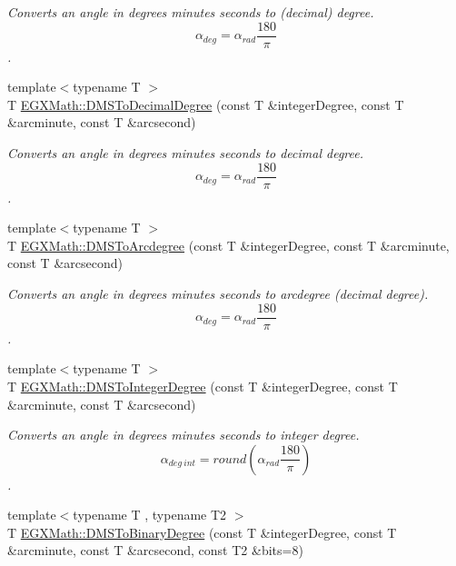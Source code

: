 \begin{DoxyCompactItemize}
\begin{DoxyCompactList}\small\item\em Converts an angle in degrees minutes seconds to (decimal) degree. \[\alpha_{deg}=\alpha_{rad}\frac{180}{\pi}\]. \end{DoxyCompactList}\item 
{\footnotesize template$<$typename T $>$ }\\T \mbox{\hyperlink{group___e_g_x_math-_angle_conversions-_d_m_s_ga10e325fbb65f6e2e7d8cd7d3d8af2931}{E\+G\+X\+Math\+::\+D\+M\+S\+To\+Decimal\+Degree}} (const T \&integer\+Degree, const T \&arcminute, const T \&arcsecond)
\begin{DoxyCompactList}\small\item\em Converts an angle in degrees minutes seconds to decimal degree. \[\alpha_{deg}=\alpha_{rad}\frac{180}{\pi}\]. \end{DoxyCompactList}\item 
{\footnotesize template$<$typename T $>$ }\\T \mbox{\hyperlink{group___e_g_x_math-_angle_conversions-_d_m_s_ga641f46ead1a3f19312aab422e569b810}{E\+G\+X\+Math\+::\+D\+M\+S\+To\+Arcdegree}} (const T \&integer\+Degree, const T \&arcminute, const T \&arcsecond)
\begin{DoxyCompactList}\small\item\em Converts an angle in degrees minutes seconds to arcdegree (decimal degree). \[\alpha_{deg}=\alpha_{rad}\frac{180}{\pi}\]. \end{DoxyCompactList}\item 
{\footnotesize template$<$typename T $>$ }\\T \mbox{\hyperlink{group___e_g_x_math-_angle_conversions-_d_m_s_ga648345592a9116cccda50f476df28586}{E\+G\+X\+Math\+::\+D\+M\+S\+To\+Integer\+Degree}} (const T \&integer\+Degree, const T \&arcminute, const T \&arcsecond)
\begin{DoxyCompactList}\small\item\em Converts an angle in degrees minutes seconds to integer degree. \[\alpha_{deg\ int}=round(\alpha_{rad}\frac{180}{\pi})\]. \end{DoxyCompactList}\item 
{\footnotesize template$<$typename T , typename T2 $>$ }\\T \mbox{\hyperlink{group___e_g_x_math-_angle_conversions-_d_m_s_gae0b9627dc69707dd6febb80306318d9a}{E\+G\+X\+Math\+::\+D\+M\+S\+To\+Binary\+Degree}} (const T \&integer\+Degree, const T \&arcminute, const T \&arcsecond, const T2 \&bits=8)

\end{DoxyCompactItemize}
